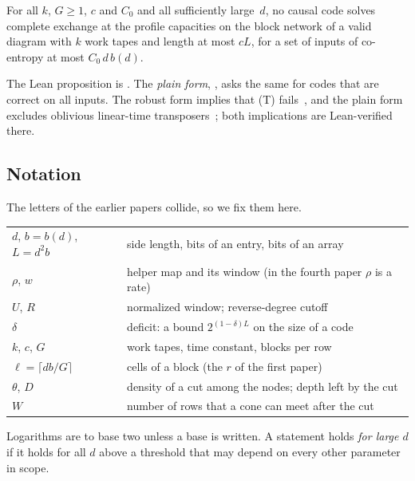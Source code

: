\begin{conjecture}\label{conj:TCC}
For all $k$, $G\ge1$, $c$ and $C_0$ and all sufficiently large~$d$, no causal code solves complete exchange at the
profile capacities on the block network of a valid diagram with $k$ work tapes and length at most $cL$, for a set of
inputs of co-entropy at most $C_0\,d\,b(d)$.
\end{conjecture}

The Lean proposition is . The \emph{plain form}, , asks the same
for codes that are correct on all inputs. The robust form implies that (T)
fails~\cite[Theorem~9.2]{FirstPaper2026}, and the plain form excludes oblivious linear-time
transposers~\cite[Theorem~9.9]{FirstPaper2026}; both implications are Lean-verified there.

\subsection{Notation}\label{sec:prelim-notation}

The letters of the earlier papers collide, so we fix them here.
\begin{center}
\begin{tabular}{@{}ll@{}}
\toprule
$d$, $b=b(d)$, $L=d^2b$ & side length, bits of an entry, bits of an array\\
$\rho$, $w$ & helper map and its window (in the fourth paper $\rho$ is a rate)\\
$U$, $R$ & normalized window; reverse-degree cutoff\\
$\delta$ & deficit: a bound $2^{(1-\delta)L}$ on the size of a code\\
$k$, $c$, $G$ & work tapes, time constant, blocks per row\\
$\ell=\lceil db/G\rceil$ & cells of a block (the $r$ of the first paper)\\
$\theta$, $D$ & density of a cut among the nodes; depth left by the cut\\
$W$ & number of rows that a cone can meet after the cut\\
\bottomrule
\end{tabular}
\end{center}
Logarithms are to base two unless a base is written. A statement holds \emph{for large $d$} if it holds for all $d$
above a threshold that may depend on every other parameter in scope.

